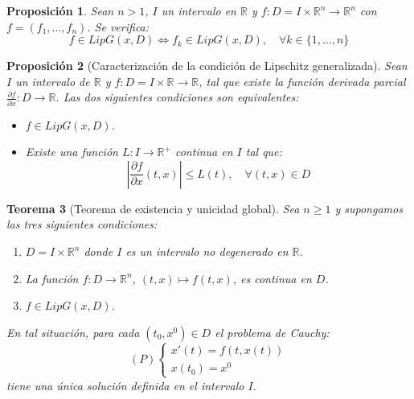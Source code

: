 \documentclass{report}
\newtheorem{theorem}{Teorema}[chapter]
\newtheorem{proposition}[theorem]{Proposición}
\theoremstyle{remark}
\theoremstyle{remark}
\theoremstyle{remark}
\theoremstyle{definition}
\theoremstyle{definition}
\theoremstyle{definition}
\begin{document}
\begin{proposition}
    Sean $n > 1$, $I$ un intervalo en $\mathbb{R}$ y $f: D = I \times \mathbb{R}^n \to \mathbb{R}^n$ con $f = (f_1, \dots, f_n)$.
    Se verifica:
    $$f \in LipG(x, D) \Leftrightarrow f_k \in LipG(x, D), \quad \forall k \in \{1, \dots, n\}$$
\end{proposition}

\begin{proposition}[Caracterización de la condición de Lipschitz generalizada]
    Sean $I$ un intervalo de $\mathbb{R}$ y $f: D = I \times \mathbb{R} \to \mathbb{R}$, tal que existe la función derivada parcial $\frac{\partial f}{\partial x}: D \to \mathbb{R}$.
    Las dos siguientes condiciones son equivalentes:
    \begin{itemize}
        \item $f \in LipG(x, D)$.
        \item Existe una función $L: I \to \mathbb{R}^+$ continua en $I$ tal que:
              $$|\frac{\partial f}{\partial x}(t, x)| \leq L(t), \quad \forall (t, x) \in D$$
    \end{itemize}
\end{proposition}

\begin{theorem}[Teorema de existencia y unicidad global]
    Sea $n \geq 1$ y supongamos las tres siguientes condiciones:
    \begin{enumerate}
        \item $D = I \times \mathbb{R}^n$ donde $I$ es un intervalo no degenerado en $\mathbb{R}$.
        \item La función $f: D \to \mathbb{R}^n$, $(t, x) \mapsto f(t, x)$, es continua en $D$.
        \item $f \in LipG(x, D)$.
    \end{enumerate}
    En tal situación, para cada $(t_0, x^0) \in D$ el problema de Cauchy:
    $$(P) \begin{cases}
            x'(t) = f(t, x(t)) \\
            x(t_0) = x^0
        \end{cases}$$
    tiene una única solución definida en el intervalo $I$.
\end{theorem}
\end{document}
